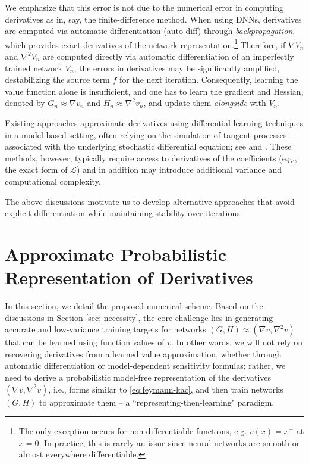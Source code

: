\documentclass[twoside,11pt]{article}
\newcommand{\1}{\mathbf{1}}
\numberwithin{equation}{section}
\begin{document}
We emphasize that this error is not due to the numerical error in computing derivatives as in, say, the finite-difference method. When using DNNs, derivatives are computed via automatic differentiation (auto-diff) through \textit{backpropagation}, which provides exact derivatives of the
network representation.\footnote{The only exception occurs for non-differentiable functions, e.g.
$v(x) = x^+$ at $x=0$. In practice, this is rarely an issue since neural networks are smooth or almost everywhere differentiable.}
Therefore, if $\nabla V_n$ and $\nabla^2 V_n$ are computed directly via automatic differentiation of an imperfectly trained network $V_n$, the errors in derivatives may be significantly amplified, destabilizing the source term $f$ for the next iteration.
Consequently, learning the value function alone is insufficient, and one has to learn the gradient and Hessian, denoted by $G_n \approx \nabla v_n$ and $H_n \approx \nabla^2 v_n$, and update them {\it alongside}  with $V_n$. %

Existing approaches approximate derivatives using differential learning techniques in a model-based setting, often relying on the simulation of tangent processes associated with the underlying stochastic differential equation; see \cite{glasserman2004monte} and \cite{huge20}.
These methods, however, typically require access to derivatives of the coefficients (e.g., the exact form of $\mathcal L$) and in addition may introduce additional variance and computational complexity.

The above discussions  motivate us to develop alternative approaches that avoid explicit differentiation while maintaining stability over iterations.




\section{Approximate Probabilistic Representation of Derivatives}

In this section, we detail the proposed numerical scheme.
Based on the discussions in Section \ref{sec: necessity}, the core challenge lies in generating accurate and low-variance training targets for networks $(G,H) \approx (\nabla v, \nabla^2 v)$ that can be learned using function values of $v$. In other words, %
we will not rely on recovering derivatives from a learned value approximation, whether through automatic differentiation or model-dependent sensitivity formulas;
rather, we need to derive a probabilistic model-free representation of the derivatives $(\nabla v, \nabla^2 v)$, i.e., forms similar to \eqref{eq:feymann-kac}, and then train networks $(G,H)$ to approximate them -- a ``representing-then-learning" paradigm.
\end{document}

